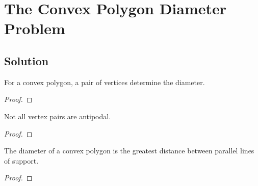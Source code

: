 
\section{The Convex Polygon Diameter Problem}	\label{section:convex-diameter}

\subsection{Solution}

\begin{theorem}
  For a convex polygon, a pair of vertices determine the diameter.
\end{theorem}

\begin{proof}
\end{proof}

\begin{definition}
\end{definition}

\begin{definition}[Antipodal]
\end{definition}

\begin{fact}
  Not all vertex pairs are antipodal.
\end{fact}

\begin{proof}
\end{proof}

\begin{theorem}[Yaglom]
  The diameter of a convex polygon is the greatest distance between parallel lines of support.
\end{theorem}

\begin{proof}
\end{proof}
